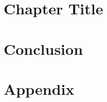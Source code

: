 \documentclass[11pt,a4paper,twoside,openright]{book}
\begin{document}
\chapter{Chapter Title} \label{sec:ch2} %
%
\chapter{Conclusion} \label{sec:concl} 
%  


\appendix
\chapter{Appendix} 

{}




\end{document}
